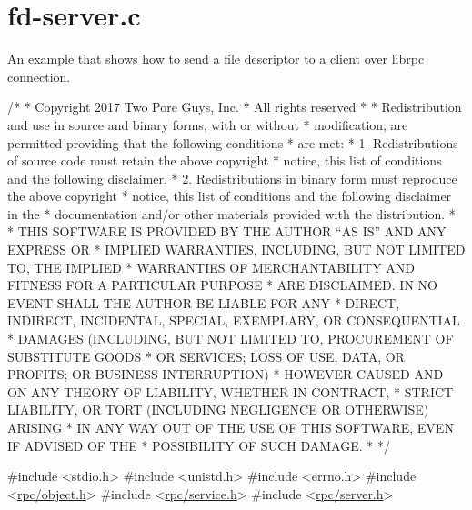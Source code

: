 \hypertarget{fd-server_8c-example}{}\section{fd-\/server.\+c}
An example that shows how to send a file descriptor to a client over librpc connection.


\begin{DoxyCodeInclude}
\textcolor{comment}{/*}
\textcolor{comment}{ * Copyright 2017 Two Pore Guys, Inc.}
\textcolor{comment}{ * All rights reserved}
\textcolor{comment}{ *}
\textcolor{comment}{ * Redistribution and use in source and binary forms, with or without}
\textcolor{comment}{ * modification, are permitted providing that the following conditions}
\textcolor{comment}{ * are met:}
\textcolor{comment}{ * 1. Redistributions of source code must retain the above copyright}
\textcolor{comment}{ *    notice, this list of conditions and the following disclaimer.}
\textcolor{comment}{ * 2. Redistributions in binary form must reproduce the above copyright}
\textcolor{comment}{ *    notice, this list of conditions and the following disclaimer in the}
\textcolor{comment}{ *    documentation and/or other materials provided with the distribution.}
\textcolor{comment}{ *}
\textcolor{comment}{ * THIS SOFTWARE IS PROVIDED BY THE AUTHOR ``AS IS'' AND ANY EXPRESS OR}
\textcolor{comment}{ * IMPLIED WARRANTIES, INCLUDING, BUT NOT LIMITED TO, THE IMPLIED}
\textcolor{comment}{ * WARRANTIES OF MERCHANTABILITY AND FITNESS FOR A PARTICULAR PURPOSE}
\textcolor{comment}{ * ARE DISCLAIMED.  IN NO EVENT SHALL THE AUTHOR BE LIABLE FOR ANY}
\textcolor{comment}{ * DIRECT, INDIRECT, INCIDENTAL, SPECIAL, EXEMPLARY, OR CONSEQUENTIAL}
\textcolor{comment}{ * DAMAGES (INCLUDING, BUT NOT LIMITED TO, PROCUREMENT OF SUBSTITUTE GOODS}
\textcolor{comment}{ * OR SERVICES; LOSS OF USE, DATA, OR PROFITS; OR BUSINESS INTERRUPTION)}
\textcolor{comment}{ * HOWEVER CAUSED AND ON ANY THEORY OF LIABILITY, WHETHER IN CONTRACT,}
\textcolor{comment}{ * STRICT LIABILITY, OR TORT (INCLUDING NEGLIGENCE OR OTHERWISE) ARISING}
\textcolor{comment}{ * IN ANY WAY OUT OF THE USE OF THIS SOFTWARE, EVEN IF ADVISED OF THE}
\textcolor{comment}{ * POSSIBILITY OF SUCH DAMAGE.}
\textcolor{comment}{ *}
\textcolor{comment}{ */}

\textcolor{preprocessor}{#include <stdio.h>}
\textcolor{preprocessor}{#include <unistd.h>}
\textcolor{preprocessor}{#include <errno.h>}
\textcolor{preprocessor}{#include <\hyperlink{object_8h}{rpc/object.h}>}
\textcolor{preprocessor}{#include <\hyperlink{service_8h}{rpc/service.h}>}
\textcolor{preprocessor}{#include <\hyperlink{server_8h}{rpc/server.h}>}


\end{DoxyCodeInclude}
